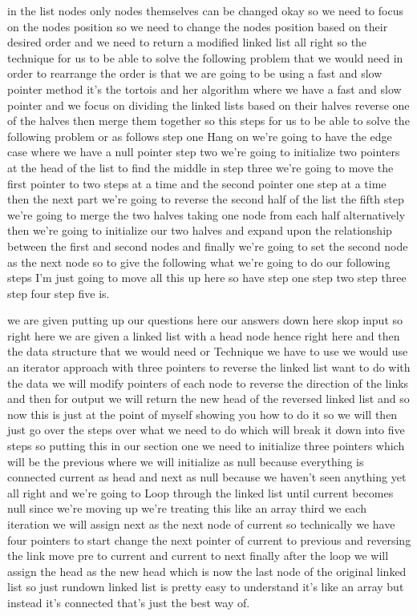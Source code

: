 \expandafter\def\csname sourceexcerpt@52\endcsname{%
in the list nodes only nodes themselves can be changed okay so we need to focus on the
nodes position so we need to change the nodes position based on their desired order
and we need to return a modified linked list all right so the technique for us to be
able to solve the following problem that we would need in order to rearrange the order
is that we are going to be using a fast and slow pointer method it's the tortois and
her algorithm where we have a fast and slow pointer and we focus on dividing the
linked lists based on their halves reverse one of the halves then merge them together
so this steps for us to be able to solve the following problem or as follows step one
Hang on we're going to have the edge case where we have a null pointer step two we're
going to initialize two pointers at the head of the list to find the middle in step
three we're going to move the first pointer to two steps at a time and the second
pointer one step at a time then the next part we're going to reverse the second half
of the list the fifth step we're going to merge the two halves taking one node from
each half alternatively then we're going to initialize our two halves and expand upon
the relationship between the first and second nodes and finally we're going to set the
second node as the next node so to give the following what we're going to do our
following steps I'm just going to move all this up here so have step one step two step
three step four step five is.
}

\expandafter\def\csname sourceexcerpt@53\endcsname{%
we are given putting up our questions here our answers down here skop input so right
here we are given a linked list with a head node hence right here and then the data
structure that we would need or Technique we have to use we would use an iterator
approach with three pointers to reverse the linked list want to do with the data we will
modify pointers of each node to reverse the direction of the links and then for output
we will return the new head of the reversed linked list and so now this is just at the
point of myself showing you how to do it so we will then just go over the steps over
what we need to do which will break it down into five steps so putting this in our
section one we need to initialize three pointers which will be the previous where we
will initialize as null because everything is connected current as head and next as
null because we haven't seen anything yet all right and we're going to Loop through
the linked list until current becomes null since we're moving up we're treating this
like an array third we each iteration we will assign next as the next node of current
so technically we have four pointers to start change the next pointer of current to
previous and reversing the link move pre to current and current to next finally after
the loop we will assign the head as the new head which is now the last node of the
original linked list so just rundown linked list is pretty easy to understand it's like an
array but instead it's connected that's just the best way of.
}

